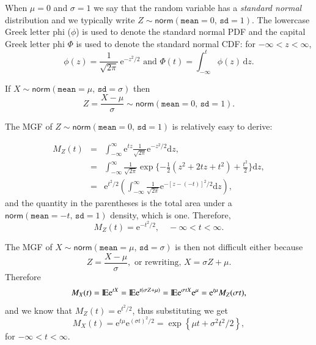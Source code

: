 \documentclass[captions=tableheading]{scrbook}
\begin{document}
When \(\mu=0\) and \(\sigma=1\) we say that the random variable has a \emph{standard normal} distribution and we typically write \(Z\sim\mathsf{norm}(\mathtt{mean}=0,\,\mathtt{sd}=1)\). The lowercase Greek letter phi (\(\phi\)) is used to denote the standard normal PDF and the capital Greek letter phi \(\Phi\) is used to denote the standard normal CDF: for \(-\infty<z<\infty\),
\begin{equation}
\phi(z)=\frac{1}{\sqrt{2\pi}}\,\mathrm{e}^{-z^{2}/2}\mbox{ and }\Phi(t)=\int_{-\infty}^{t}\phi(z)\,\mathrm{d} z.
\end{equation}

\begin{prop}
If \(X\sim\mathsf{norm}(\mathtt{mean}=\mu,\,\mathtt{sd}=\sigma)\) then
\begin{equation}
Z=\frac{X-\mu}{\sigma}\sim\mathsf{norm}(\mathtt{mean}=0,\,\mathtt{sd}=1).
\end{equation}
\end{prop}

The MGF of \(Z\sim\mathsf{norm}(\mathtt{mean}=0,\,\mathtt{sd}=1)\) is relatively easy to derive:

\begin{eqnarray*}
M_{Z}(t) & = & \int_{-\infty}^{\infty}\mathrm{e}^{tz}\frac{1}{\sqrt{2\pi}}\mathrm{e}^{-z^{2}/2}\mathrm{d} z,\\
 & = & \int_{-\infty}^{\infty}\frac{1}{\sqrt{2\pi}}\exp \{ -\frac{1}{2}\left(z^{2}+2tz+t^{2}\right)+\frac{t^{2}}{2} \} \mathrm{d} z,\\
 & = & \mathrm{e}^{t^{2}/2}\left(\int_{-\infty}^{\infty}\frac{1}{\sqrt{2\pi}}\mathrm{e}^{-[z-(-t)]^{2}/2}\mathrm{d} z\right),
\end{eqnarray*}
and the quantity in the parentheses is the total area under a \(\mathsf{norm}(\mathtt{mean}=-t,\,\mathtt{sd}=1)\) density, which is one. Therefore,
\begin{equation}
M_{Z}(t)=\mathrm{e}^{-t^{2}/2},\quad-\infty<t<\infty.
\end{equation}

\begin{example}
The MGF of \(X\sim\mathsf{norm}(\mathtt{mean}=\mu,\,\mathtt{sd}=\sigma)\) is then not difficult either because 
\[
Z=\frac{X-\mu}{\sigma},\mbox{ or rewriting, }X=\sigma Z+\mu.
\]
Therefore
\[
M_{X}(t)=\mathrm{I\hspace{-1.5pt}E}\mathrm{e}^{tX}=\mathrm{I\hspace{-1.5pt}E}\mathrm{e}^{t(\sigma Z+\mu)}=\mathrm{I\hspace{-1.5pt}E}\mathrm{e}^{\sigma tX}\mathrm{e}^{\mu}=\mathrm{e}^{t\mu}M_{Z}(\sigma t),
\]
and we know that \(M_{Z}(t)=\mathrm{e}^{t^{2}/2}\), thus substituting we get
\[
M_{X}(t)=\mathrm{e}^{t\mu}\mathrm{e}^{(\sigma t)^{2}/2}=\exp\left\{ \mu t+\sigma^{2}t^{2}/2\right\} ,
\]
for \(-\infty<t<\infty\).
\end{example}
\end{document}
